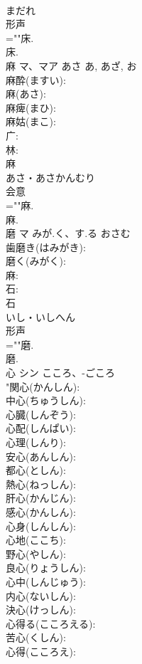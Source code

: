 \documentclass[8pt]{extreport}
\begin{document}
\begin{CJK}{UTF8}{min}
\\	まだれ	
\\	形声 
\\	=""床.
\\	床.
\\	麻	マ、マア	あさ	あ, あざ, お	
\\	麻酔(ますい): 
\\	麻(あさ): 
\\	麻痺(まひ): 
\\	麻姑(まこ): 
\\	广: 
\\	林: 
\\	麻	
\\	あさ・あさかんむり	
\\	会意 
\\	=""麻.
\\	麻.
\\	磨	マ	みが.く、す.る	おさむ	
\\	歯磨き(はみがき): 
\\	磨く(みがく): 
\\	麻: 
\\	石: 
\\	石	
\\	いし・いしへん	
\\	形声 
\\	=""磨.
\\	磨.
\\	心	シン	こころ、-ごころ		
\\	"関心(かんしん): 
\\	中心(ちゅうしん): 
\\	心臓(しんぞう): 
\\	心配(しんぱい): 
\\	心理(しんり): 
\\	安心(あんしん): 
\\	都心(としん): 
\\	熱心(ねっしん): 
\\	肝心(かんじん): 
\\	感心(かんしん): 
\\	心身(しんしん): 
\\	心地(ここち): 
\\	野心(やしん): 
\\	良心(りょうしん): 
\\	心中(しんじゅう): 
\\	内心(ないしん): 
\\	決心(けっしん): 
\\	心得る(こころえる): 
\\	苦心(くしん): 
\\	心得(こころえ): 

\end{CJK}
\end{document}
